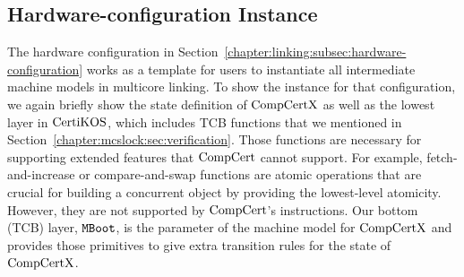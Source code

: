 
\subsection{Hardware-configuration Instance}
\label{chapter:certikos:subsec:hardware-configuration-instance}

The hardware configuration in Section~\ref{chapter:linking:subsec:hardware-configuration} works as a 
template for users to instantiate all intermediate machine models in multicore linking. 
To show the instance for that configuration,
we again briefly show the state definition of $\mathrm{CompCertX}$
as well as the lowest layer in $\mathrm{CertiKOS}$, which includes TCB functions that we mentioned in Section~\ref{chapter:mcslock:sec:verification}.
Those functions are 
necessary for supporting extended features that $\mathrm{CompCert}$ cannot support. 
For example, 
fetch-and-increase or compare-and-swap functions are atomic operations that are crucial for building a 
concurrent object by providing the lowest-level atomicity. 
However, they are not supported by $\mathrm{CompCert}$'s instructions.
Our bottom (TCB) layer, ${\mathrm{\texttt{MBoot}}}$, is the parameter of the machine model for $\mathrm{CompCertX}$ 
and provides those  primitives to give  extra transition rules for the state of $\mathrm{CompCertX}$.
%
%



